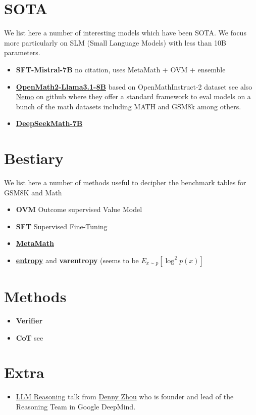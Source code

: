 \documentclass{article}
\begin{document}
\section{SOTA}
We list here a number of interesting models which have been SOTA. We focus more particularly on SLM (Small Language Models) with less than 10B parameters.
\begin{itemize}
\item \textbf{SFT-Mistral-7B} no citation, uses MetaMath + OVM + ensemble
\item \href{https://paperswithcode.com/paper/openmathinstruct-2-accelerating-ai-for-math}{\textbf{OpenMath2-Llama3.1-8B}} based on OpenMathInstruct-2 dataset \cite{omi2} see also \href{https://github.com/Kipok/NeMo-Skills/tree/main}{Nemo} on github where they offer a standard framework to eval models on a bunch of the math datasets including MATH and GSM8k among others.
\item \href{https://paperswithcode.com/paper/an-empirical-study-of-data-ability-boundary}{\textbf{DeepSeekMath-7B}}
\end{itemize}

\section{Bestiary}
We list here a number of methods useful to decipher the benchmark tables for GSM8K and Math
\begin{itemize}
\item \textbf{OVM} Outcome supervised Value Model \cite{OVM} 
\item \textbf{SFT} Supervised Fine-Tuning
\item \href{https://github.com/meta-math/MetaMath?search=1}{\textbf{MetaMath}}
\item \href{https://github.com/xjdr-alt/entropix}{\textbf{entropy}} and \textbf{varentropy} (seems to be $E_{x\sim p}\left[\log^2 p(x)\right]$
\end{itemize}

\section{Methods}
\begin{itemize}
\item \textbf{Verifier} \cite{cobbe}
\item \textbf{CoT} see \cite{wei} \cite{wang2024}
\end{itemize}

\section{Extra}
\begin{itemize}
\item \href{https://dennyzhou.github.io/LLM-Reasoning-Berkeley.pdf}{LLM Reasoning} talk from \href{https://dennyzhou.github.io/}{Denny Zhou} who is founder and lead of the Reasoning Team in Google DeepMind.
\end{itemize}
\end{document}
